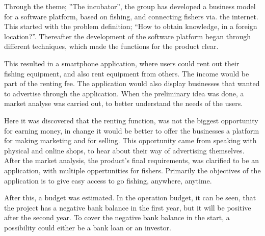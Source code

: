 \vspace{1cm}
\begin{center}
\begin{minipage}{0.5\textwidth}
Through the theme; ”The incubator”, the group has developed a business model for a software platform, based on fishing, and connecting fishers via. the internet. This started with the problem definition; “How to obtain knowledge, in a foreign location?”. 
Thereafter the development of the software platform began through different techniques, which made the functions for the product clear. 

This resulted in a smartphone application, where users could rent out their fishing equipment, and also rent equipment from others. The income would be part of the renting fee. The application would also display businesses that wanted to advertise through the application. When the preliminary idea was done, a market analyse was carried out, to better understand the needs of the users. 

Here it was discovered that the renting function, was not the biggest opportunity for earning money, in change it would be better to offer the businesses a platform for making marketing and for selling. This opportunity came from speaking with physical and online shops, to hear about their way of advertising themselves. After the market analysis, the product's final requirements, was clarified to be an application, with multiple oppertunities for fishers. Primarily the objectives of the application is to give easy access to go fishing, anywhere, anytime.


After this, a budget was estimated. In the operation budget, it can be seen, that the project has a negative bank balance in the first year, but it will be positive after the second year. To cover the negative bank balance in the start, a possibility could either be a bank loan or an investor. 
\end{minipage}	
\end{center}
